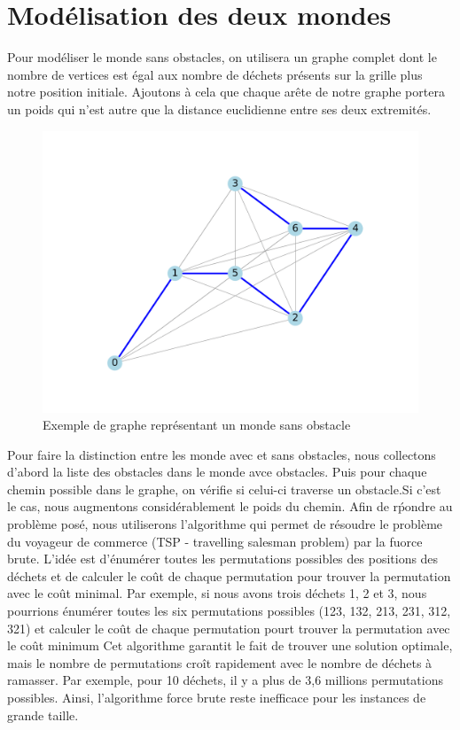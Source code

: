 \documentclass{report}
\begin{document}
\section{\Large Mod\'elisation des deux mondes}
\hspace{0,5 cm} \Large Pour mod\'eliser le monde sans obstacles, on utilisera un graphe complet dont le nombre de vertices est \'egal aux nombre de d\'echets pr\'esents sur la grille plus notre 
position initiale. Ajoutons \`a cela que chaque ar\^ete de notre graphe portera un poids qui n'est autre que la distance euclidienne entre ses deux extremit\'es.
\begin{figure}[!h]
    \centerline{\includegraphics[scale=1]{best_path_arbitrary-1.png}}
    \caption{Exemple de graphe repr\'esentant un monde sans obstacle} 
  \end{figure}
Pour faire la distinction entre les monde avec et sans obstacles, nous collectons d'abord la liste des obstacles dans le monde avce obstacles. Puis pour chaque chemin possible dans le graphe,
on v\'erifie si celui-ci traverse un obstacle.Si c'est le cas, nous augmentons considérablement le poids du chemin.
Afin de r\'pondre au problème posé, nous utiliserons l'algorithme qui permet de résoudre le problème du voyageur de commerce (TSP - travelling salesman problem) par la fuorce brute. L'id\'ee est d'\'enum\'erer toutes 
les permutations possibles des positions des d\'echets et de calculer le co\^ut de chaque permutation pour trouver la permutation avec le co\^ut minimal. Par exemple, si nous avons trois d\'echets 1, 2 et 3, nous pourrions \'enum\'erer toutes les six permutations possibles (123, 132, 213, 231, 312, 321) et calculer le co\^ut de chaque permutation pourt trouver la permutation avec le co\^ut minimum
Cet algorithme garantit le fait de trouver une solution optimale, mais le nombre de permutations cro\^it rapidement avec le nombre de d\'echets \`a ramasser. Par exemple, pour 10 d\'echets, il y a plus de 3,6 millions permutations possibles. Ainsi, l'algorithme force brute reste inefficace pour les instances de grande taille.
\end{document}
